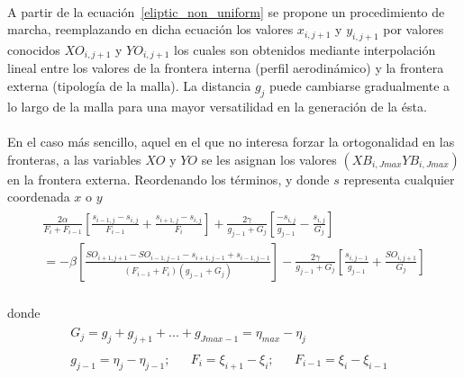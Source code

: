 \documentclass[letterpaper, openright, 12pt]{book}
\begin{document}
    \paragraph*{}
        A partir de la ecuación~\ref{eliptic_non_uniform} se propone un
        procedimiento de marcha, reemplazando en dicha ecuación los valores
        $x_{i, j + 1}$ y $y_{i, j+1}$ por valores conocidos $XO_{i, j + 1}$ y
        $YO_{i, j + 1}$ los cuales son obtenidos mediante interpolación lineal
        entre los valores de la frontera interna (perfil aerodinámico) y la
        frontera externa (tipología de la malla). La distancia $g_j$ puede
        cambiarse gradualmente a lo largo de la malla para una mayor
        versatilidad en la generación de la ésta.
    \paragraph*{}
        En el caso más sencillo, aquel en el que no interesa forzar la
        ortogonalidad en las fronteras, a las variables $XO$ y $YO$ se les
        asignan los valores $(XB_{i, Jmax} YB_{i, Jmax})$ en la frontera
        externa. Reordenando los términos, y donde $s$ representa cualquier
        coordenada $x$ o $y$\\
        \begin{align}
            \begin{aligned}
                \frac{2\alpha}{F_i + F_{i - 1}} \left[ \frac{s_{i-1, j} - s_{i, j}}{F_{i - 1}} + \frac{s_{i+1, j} - s_{i, j}}{F_i} \right] + \frac{2\gamma}{g_{j - 1} + G_j} \left[ \frac{-s_{i, j}}{g_{j - 1}} - \frac{s_{i, j}}{G_j} \right]\\
                = -\beta \left[ \frac{ SO_{i+1, j+1} - SO_{i-1, j-1} - s_{i+1, j-1} + s_{i-1, j-1} }{ (F_{i - 1} + F_i) (g_{j - 1} + G_j) } \right] - \frac{2\gamma}{g_{j-1} + G_j} \left[ \frac{s_{i, j - 1}}{g_{j - 1}} + \frac{SO_{i, j + 1}}{G_j} \right]
            \end{aligned}
            \label{eliptic_non_uniform1}
        \end{align}\\
        donde
        \begin{align*}
            &\begin{aligned}
            G_j = g_j + g_{j + 1} + ... + g_{Jmax - 1} = \eta_{max} - \eta_j
            \end{aligned}\\
            &\begin{aligned}
            g_{j - 1} = \eta_j - \eta_{j - 1};&& F_i = \xi_{i + 1} - \xi_i; && F_{i - 1} = \xi_i - \xi_{i - 1}&&
            \end{aligned}
        \end{align*}\\
\end{document}
